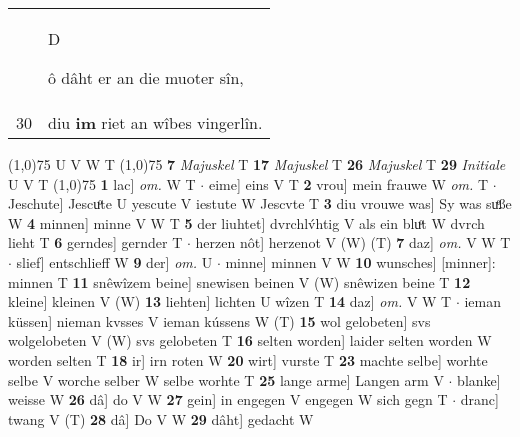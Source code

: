 \documentclass[8pt,a4paper,notitlepage]{article}
\begin{document}
\begin{table}[ht]
\begin{minipage}[t]{0.5\linewidth}
\begin{tabular}{rl}
 & \begin{large}D\end{large}ô dâht er an die muoter sîn,\\ 
30 & diu \textbf{im} riet an wîbes vingerlîn.\\ 
\end{tabular}
\scriptsize
\line(1,0){75} \newline
U V W T \newline
\line(1,0){75} \newline
\textbf{7} \textit{Majuskel} T  \textbf{17} \textit{Majuskel} T  \textbf{26} \textit{Majuskel} T  \textbf{29} \textit{Initiale} U V T  \newline
\line(1,0){75} \newline
\textbf{1} lac] \textit{om.} W T  $\cdot$ eime] eins V T \textbf{2} vrou] mein frauwe W \textit{om.} T  $\cdot$ Jeschute] Jescuͦte U yescute V iestute W Jescvte T \textbf{3} diu vrouwe was] Sy was suͤße W \textbf{4} minnen] minne V W T \textbf{5} der liuhtet] dvrchlv́htig V als ein bluͦt W dvrch lieht T \textbf{6} gerndes] gernder T  $\cdot$ herzen nôt] herzenot V (W) (T) \textbf{7} daz] \textit{om.} V W T  $\cdot$ slief] entschlieff W \textbf{9} der] \textit{om.} U  $\cdot$ minne] minnen V W \textbf{10} wunsches] [minner]: minnen T \textbf{11} snêwîzem beine] snewisen beinen V (W) snêwizen beine T \textbf{12} kleine] kleinen V (W) \textbf{13} liehten] lichten U wîzen T \textbf{14} daz] \textit{om.} V W T  $\cdot$ ieman küssen] nieman kvsses V ieman kússens W (T) \textbf{15} wol gelobeten] svs wolgelobeten V (W) svs gelobeten T \textbf{16} selten worden] laider selten worden W worden selten T \textbf{18} ir] irn roten W \textbf{20} wirt] vurste T \textbf{23} machte selbe] worhte selbe V worche selber W selbe worhte T \textbf{25} lange arme] Langen arm V  $\cdot$ blanke] weisse W \textbf{26} dâ] do V W \textbf{27} gein] in engegen V engegen W sich gegn T  $\cdot$ dranc] twang V (T) \textbf{28} dâ] Do V W \textbf{29} dâht] gedacht W \newline
\end{minipage}
\end{table}
\end{document}
